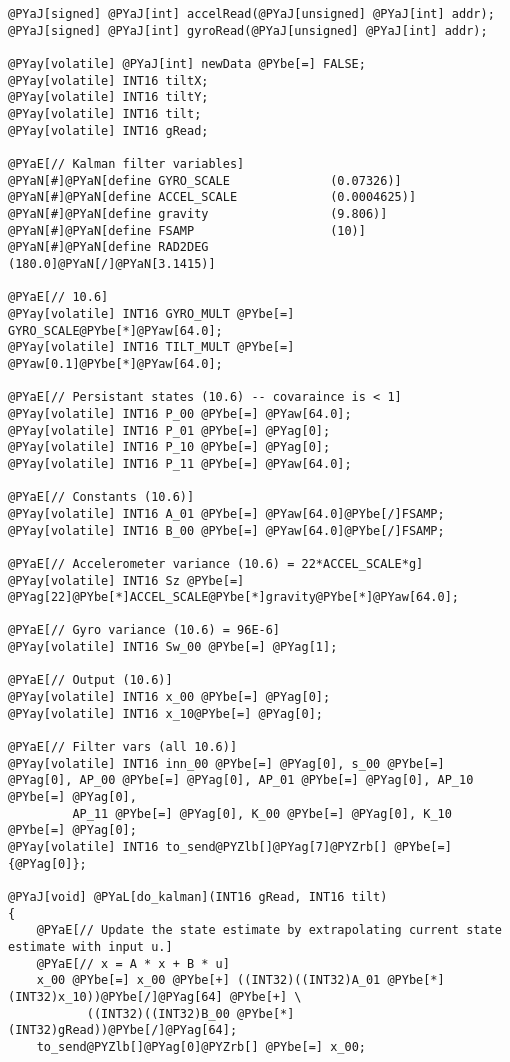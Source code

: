 \section*{}
{
\footnotesize{
\begin{Verbatim}[commandchars=@\[\]]
@PYaJ[signed] @PYaJ[int] accelRead(@PYaJ[unsigned] @PYaJ[int] addr);
@PYaJ[signed] @PYaJ[int] gyroRead(@PYaJ[unsigned] @PYaJ[int] addr);

@PYay[volatile] @PYaJ[int] newData @PYbe[=] FALSE;
@PYay[volatile] INT16 tiltX;
@PYay[volatile] INT16 tiltY;
@PYay[volatile] INT16 tilt;
@PYay[volatile] INT16 gRead;

@PYaE[// Kalman filter variables]
@PYaN[#]@PYaN[define GYRO_SCALE              (0.07326)]
@PYaN[#]@PYaN[define ACCEL_SCALE             (0.0004625)]
@PYaN[#]@PYaN[define gravity                 (9.806)]
@PYaN[#]@PYaN[define FSAMP                   (10)]
@PYaN[#]@PYaN[define RAD2DEG                 (180.0]@PYaN[/]@PYaN[3.1415)]

@PYaE[// 10.6]
@PYay[volatile] INT16 GYRO_MULT @PYbe[=] GYRO_SCALE@PYbe[*]@PYaw[64.0];
@PYay[volatile] INT16 TILT_MULT @PYbe[=] @PYaw[0.1]@PYbe[*]@PYaw[64.0];

@PYaE[// Persistant states (10.6) -- covaraince is < 1]
@PYay[volatile] INT16 P_00 @PYbe[=] @PYaw[64.0];
@PYay[volatile] INT16 P_01 @PYbe[=] @PYag[0];
@PYay[volatile] INT16 P_10 @PYbe[=] @PYag[0];
@PYay[volatile] INT16 P_11 @PYbe[=] @PYaw[64.0];

@PYaE[// Constants (10.6)]
@PYay[volatile] INT16 A_01 @PYbe[=] @PYaw[64.0]@PYbe[/]FSAMP;
@PYay[volatile] INT16 B_00 @PYbe[=] @PYaw[64.0]@PYbe[/]FSAMP;

@PYaE[// Accelerometer variance (10.6) = 22*ACCEL_SCALE*g]
@PYay[volatile] INT16 Sz @PYbe[=] @PYag[22]@PYbe[*]ACCEL_SCALE@PYbe[*]gravity@PYbe[*]@PYaw[64.0];

@PYaE[// Gyro variance (10.6) = 96E-6]
@PYay[volatile] INT16 Sw_00 @PYbe[=] @PYag[1];

@PYaE[// Output (10.6)]
@PYay[volatile] INT16 x_00 @PYbe[=] @PYag[0];
@PYay[volatile] INT16 x_10@PYbe[=] @PYag[0];

@PYaE[// Filter vars (all 10.6)]
@PYay[volatile] INT16 inn_00 @PYbe[=] @PYag[0], s_00 @PYbe[=] @PYag[0], AP_00 @PYbe[=] @PYag[0], AP_01 @PYbe[=] @PYag[0], AP_10 @PYbe[=] @PYag[0],
         AP_11 @PYbe[=] @PYag[0], K_00 @PYbe[=] @PYag[0], K_10 @PYbe[=] @PYag[0];
@PYay[volatile] INT16 to_send@PYZlb[]@PYag[7]@PYZrb[] @PYbe[=] {@PYag[0]};

@PYaJ[void] @PYaL[do_kalman](INT16 gRead, INT16 tilt)
{
    @PYaE[// Update the state estimate by extrapolating current state estimate with input u.]
    @PYaE[// x = A * x + B * u]
    x_00 @PYbe[=] x_00 @PYbe[+] ((INT32)((INT32)A_01 @PYbe[*] (INT32)x_10))@PYbe[/]@PYag[64] @PYbe[+] \
           ((INT32)((INT32)B_00 @PYbe[*] (INT32)gRead))@PYbe[/]@PYag[64];
    to_send@PYZlb[]@PYag[0]@PYZrb[] @PYbe[=] x_00;


\end{Verbatim}}}
